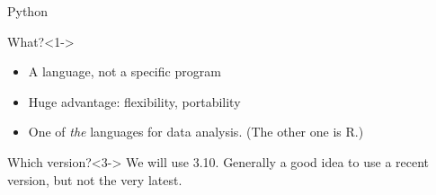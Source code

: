 \documentclass[compress]{beamer}
\begin{document}
\begin{frame}{Python}
\begin{block}{What?}<1->
\begin{itemize}
\item A language, not a specific program
\item Huge advantage: flexibility, portability
\item One of \emph{the} languages for data analysis. \tiny{(The other one is R.)}
\end{itemize}
\end{block}

\begin{block}{Which version?}<3->
We will use 3.10. Generally a good idea to use a recent version, but not the very latest. 
\end{block}
\end{frame}
\end{document}
